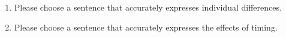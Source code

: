 \begin{enumerate}
	\item Please choose a sentence that accurately expresses individual differences.
	\item Please choose a sentence that accurately expresses the effects of timing.
\end{enumerate}
